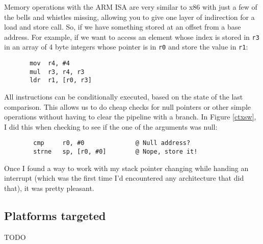 \documentclass[12pt]{article}
\newcommand{\TODO}[1]{{\huge\color{red}TODO \Large #1}}
\newcommand{\code}[1]{{\tt #1}}
\begin{document}
Memory operations with the ARM ISA are very similar to x86 with just a few of
the bells and whistles missing, allowing you to give one layer of indirection
for a load and store call. So, if we have something stored at an offset from a
base address. For example, if we want to access an element whose index is
stored in \code{r3} in an array of 4 byte integers whose pointer is in
\code{r0} and store the value in \code{r1}:

\begin{verbatim}
       mov  r4, #4
       mul  r3, r4, r3
       ldr  r1, [r0, r3]
\end{verbatim}

All instructions can be conditionally executed, based on the state of the last
comparison. This allows us to do cheap checks for null pointers or other simple
operations without having to clear the pipeline with a branch. In Figure
\ref{ctxsw}, I did this when checking to see if the one of the arguments was
null:

\begin{verbatim}
        cmp     r0, #0              @ Null address?
        strne   sp, [r0, #0]        @ Nope, store it!
\end{verbatim}

Once I found a way to work with my stack pointer changing while handing an
interrupt (which was the first time I'd encountered any architecture that did
that), it was pretty pleasant.

\subsection{Platforms targeted}

\TODO{}
\end{document}
